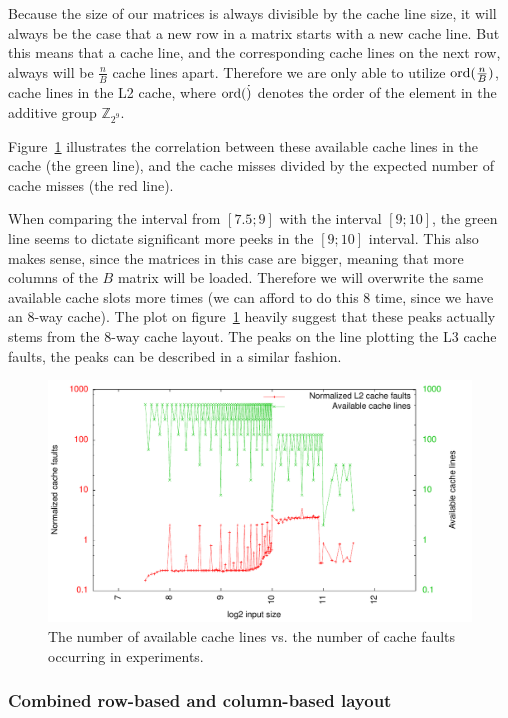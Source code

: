 Because the size of our matrices is always divisible by the cache line
size, it will always be the case that a new row in a matrix starts
with a new cache line. But this means that a cache line, and the
corresponding cache lines on the next row, always will be
$\frac{n}{B}$ cache lines apart. Therefore we are only able to utilize
$\operatorname{ord}(\frac{n}{B})$, cache lines in the L2 cache, where $\operatorname{ord}(\dot)$
denotes the order of the element in the additive group
$\mathbb{Z}_{2^9}$.

Figure~\ref{fig:rowrow_cachepeaks} illustrates the correlation between
these available cache lines in the cache (the green line), and the
cache misses divided by the expected number of cache misses (the red
line).

When comparing the interval from $[7.5; 9]$ with the interval $[9;
  10]$, the green line seems to dictate significant more peeks in the
$[9; 10]$ interval. This also makes sense, since the matrices in this
case are bigger, meaning that more columns of the $B$ matrix will be
loaded. Therefore we will overwrite the same available cache slots
more times (we can afford to do this 8 time, since we have an 8-way
cache). The plot on figure~\ref{fig:rowrow_cachepeaks} heavily suggest
that these peaks actually stems from the 8-way cache layout.  The
peaks on the line plotting the L3 cache faults, the peaks can be
described in a similar fashion.

\begin{figure}[h!]
  \centering
  \includegraphics{plots/rowrow_cachepeaks}
  \caption{The number of available cache lines vs. the number of cache
    faults occurring in experiments.}
  \label{fig:rowrow_cachepeaks}
\end{figure}

\subsubsection{Combined row-based and column-based layout}

